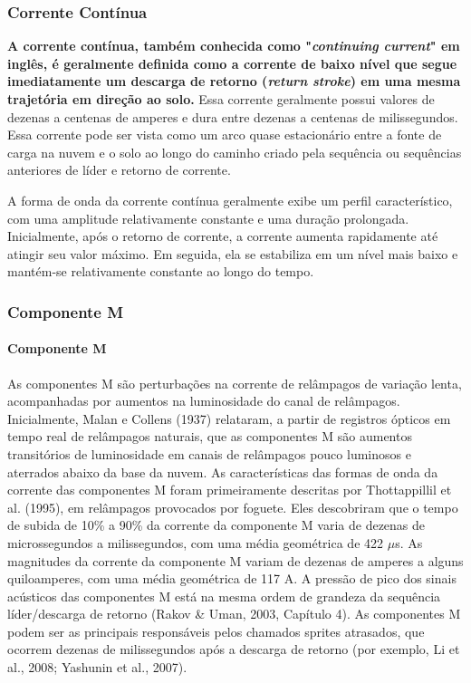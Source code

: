 \documentclass[a4paper, 12pt, onecolumn,singlespacing]{article}
\begin{document}
	\subsubsection{Corrente Contínua}
	
		\textbf{A corrente contínua, também conhecida como "\textit{continuing current}" em inglês, é geralmente definida como a corrente de baixo nível que segue imediatamente um descarga de retorno (\textit{return stroke}) em uma mesma trajetória em direção ao solo.} Essa corrente geralmente possui valores de dezenas a centenas de amperes e dura entre dezenas a centenas de milissegundos. Essa corrente pode ser vista como um arco quase estacionário entre a fonte de carga na nuvem e o solo ao longo do caminho criado pela sequência ou sequências anteriores de líder e retorno de corrente.
		
		A forma de onda da corrente contínua geralmente exibe um perfil característico, com uma amplitude relativamente constante e uma duração prolongada. Inicialmente, após o retorno de corrente, a corrente aumenta rapidamente até atingir seu valor máximo. Em seguida, ela se estabiliza em um nível mais baixo e mantém-se relativamente constante ao longo do tempo. 
	
	\subsubsection{Componente M}
		\paragraph{Componente M}
		As componentes M são perturbações na corrente de relâmpagos de variação lenta, acompanhadas por aumentos na luminosidade do canal de relâmpagos. Inicialmente, Malan e Collens (1937) relataram, a partir de registros ópticos em tempo real de relâmpagos naturais, que as componentes M são aumentos transitórios de luminosidade em canais de relâmpagos pouco luminosos e aterrados abaixo da base da nuvem. As características das formas de onda da corrente das componentes M foram primeiramente descritas por Thottappillil et al. (1995), em relâmpagos provocados por foguete. Eles descobriram que o tempo de subida de 10\% a 90\% da corrente da componente M varia de dezenas de microssegundos a milissegundos, com uma média geométrica de 422 $\mu$s. As magnitudes da corrente da componente M variam de dezenas de amperes a alguns quiloamperes, com uma média geométrica de 117 A. A pressão de pico dos sinais acústicos das componentes M está na mesma ordem de grandeza da sequência líder/descarga de retorno (Rakov \& Uman, 2003, Capítulo 4). As componentes M podem ser as principais responsáveis pelos chamados sprites atrasados, que ocorrem dezenas de milissegundos após a descarga de retorno (por exemplo, Li et al., 2008; Yashunin et al., 2007).
	
\end{document}
